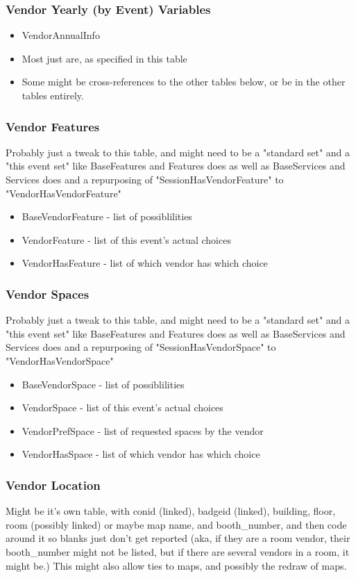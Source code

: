 \documentclass[captions=tablesignature]{scrartcl}
\begin{document}
\subsubsection{Vendor Yearly (by Event) Variables}
\label{sec-2-5-2}
\begin{itemize}
\item VendorAnnualInfo
\item Most just are, as specified in this table
\item Some might be cross-references to the other tables below, or be
in the other tables entirely.
\end{itemize}

\subsubsection{Vendor Features}
\label{sec-2-5-3}
Probably just a tweak to this table, and might need to be a
"standard set" and a "this event set" like BaseFeatures and
Features does as well as BaseServices and Services does and a
repurposing of "SessionHasVendorFeature" to
"VendorHasVendorFeature"
\begin{itemize}
\item BaseVendorFeature - list of possiblilities
\item VendorFeature - list of this event's actual choices
\item VendorHasFeature - list of which vendor has which choice
\end{itemize}

\subsubsection{Vendor Spaces}
\label{sec-2-5-4}
Probably just a tweak to this table, and might need to be a
"standard set" and a "this event set" like BaseFeatures and
Features does as well as BaseServices and Services does and a
repurposing of "SessionHasVendorSpace" to "VendorHasVendorSpace"
\begin{itemize}
\item BaseVendorSpace - list of possiblilities
\item VendorSpace - list of this event's actual choices
\item VendorPrefSpace - list of requested spaces by the vendor
\item VendorHasSpace - list of which vendor has which choice
\end{itemize}

\subsubsection{Vendor Location}
\label{sec-2-5-5}
Might be it's own table, with conid (linked), badgeid (linked),
building, floor, room (possibly linked) or maybe map name, and
booth\_number, and then code around it so blanks just don't get
reported (aka, if they are a room vendor, their booth\_number might
not be listed, but if there are several vendors in a room, it
might be.)  This might also allow ties to maps, and possibly the
redraw of maps.
\end{document}
